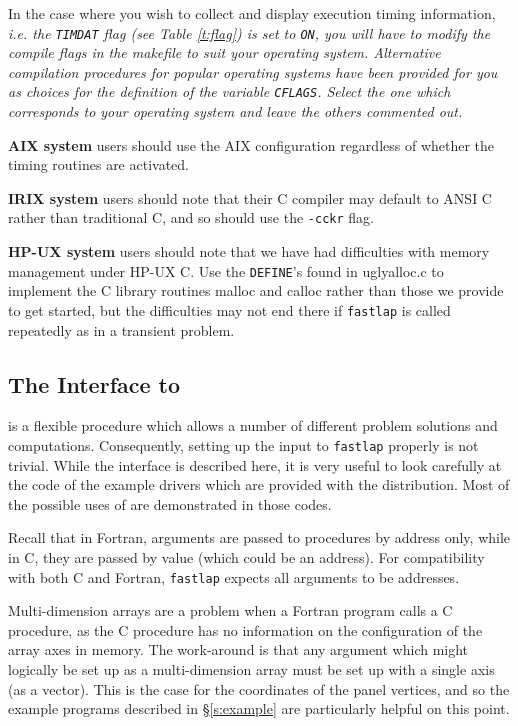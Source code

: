In the case where you wish to collect and display \fas execution 
timing information, \it i.e. \rm the {\tt TIMDAT} flag 
(see Table \ref{t:flag}) is set to {\tt ON}, you will \it have \rm 
to modify the compile flags in the makefile to suit your operating system. 
Alternative compilation procedures for popular operating systems have
been provided for you as choices for the definition of the 
variable {\tt CFLAGS}.   Select the one which corresponds to your operating 
system and leave the others commented out.  

{\bf AIX system} users should use the AIX configuration regardless of 
whether the timing routines are activated.

{\bf IRIX system} users should note that their C compiler may default
to ANSI C rather than traditional C, and so should use the {\tt -cckr}
flag.

{\bf HP-UX system} users should note that we have had difficulties 
with memory management under HP-UX C.  Use the {\tt DEFINE}'s found
in {uglyalloc.c} to implement the C library routines malloc and calloc rather 
than those we provide to get started, but the difficulties may not 
end there if {\tt fastlap} is called repeatedly as in a transient
problem.

\subsection{The Interface to \fas}
\label{ss:iface}
\fas is a flexible procedure which allows a number of different
problem solutions and computations.  Consequently, setting up the input to 
{\tt fastlap} properly is not trivial.  While the interface is described
here, it is very useful to look carefully at the code of the example 
drivers which are provided with the distribution.  Most of the possible
uses of \fas are demonstrated in those codes.

Recall that in Fortran, arguments are passed to procedures by address
only, while in C, they are passed by value (which could be an address). 
For compatibility with both C and Fortran, {\tt fastlap} expects all 
arguments to be addresses.  

Multi-dimension arrays are a problem when a Fortran 
program calls a C procedure, as the C procedure has no information
on the configuration of the array axes in memory.  The work-around  is 
that any argument which might logically be set up as a multi-dimension
array must be set up with a single axis (as a vector).  This is the case
for the coordinates of the panel vertices, and so the example programs
described in \S\ref{s:example} are particularly helpful on this
point.


